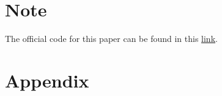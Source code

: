 \documentclass{article}
\begin{document}
\section*{Note}
The official code for this paper can be found in this \href{https://github.com/Avyukta-Manjunatha-Vummintala/FROC_code/tree/main}{link}.
\newpage
\section*{Appendix}




\end{document}
